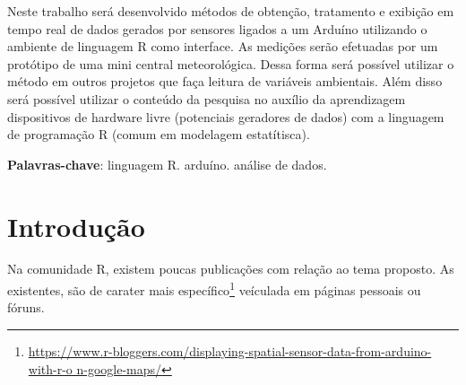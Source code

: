 \documentclass[
	article,			%
	11pt,				%
	oneside,			%
	a4paper,			%
	english,			%
	brazil,				%
	sumario=tradicional
	]{abntex2}
\begin{document}

\frenchspacing 


%
%
\maketitle

\begin{resumoumacoluna}
 Neste trabalho será desenvolvido métodos de obtenção, tratamento e exibição em tempo real de dados gerados por sensores ligados a um Arduíno utilizando o ambiente de linguagem R como interface. As medições serão efetuadas por um protótipo de uma mini central meteorológica. Dessa forma será possível utilizar o método em outros projetos que faça leitura de variáveis ambientais. Além disso será possível utilizar o conteúdo da pesquisa no auxílio da aprendizagem dispositivos de hardware livre (potenciais geradores de dados) com a linguagem de programação R (comum em modelagem estatítisca).
 
 \vspace{\onelineskip}
 
 \noindent
 \textbf{Palavras-chave}: linguagem R. arduíno. análise de dados.
\end{resumoumacoluna}


\textual

\section*{Introdução}

Na comunidade R, existem poucas publicações com relação ao tema proposto. As 
existentes, são de carater mais 
específico\footnote{\url{
https://www.r-bloggers.com/displaying-spatial-sensor-data-from-arduino-with-r-o
n-google-maps/}} veículada em páginas pessoais ou fóruns. 
\end{document}
